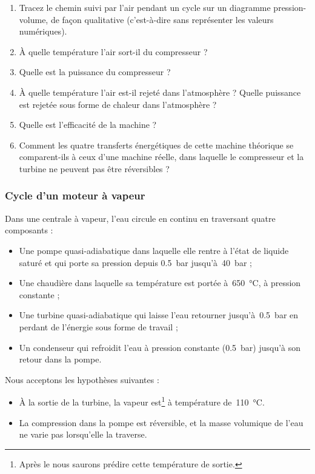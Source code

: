 	\begin{enumerate}
		\item Tracez le chemin suivi par l’air pendant un cycle sur un diagramme pression-volume, de façon qualitative (c’est-à-dire sans représenter les valeurs numériques).
		\item À quelle température l’air sort-il du compresseur ?
		\item Quelle est la puissance du compresseur ?
		\item À quelle température l’air est-il rejeté dans l’atmosphère ? Quelle puissance est rejetée sous forme de chaleur dans l’atmosphère ?
		\item Quelle est l’efficacité de la machine ?
		\item Comment les quatre transferts énergétiques de cette machine théorique se comparent-ils à ceux d’une machine réelle, dans laquelle le compresseur et la turbine ne peuvent pas être réversibles ?
	\end{enumerate}


\subsubsection{Cycle d’un moteur à vapeur}
\label{exo_centrale_vapeur_cycle}

	Dans une centrale à vapeur, l’eau circule en continu en traversant quatre composants :
	
	\begin{itemize}
		\item Une pompe quasi-adiabatique dans laquelle elle rentre à l’état de liquide saturé et qui porte sa pression depuis \SI{0,5}{\bar} jusqu’à~\SI{40}{\bar} ;
		\item Une chaudière dans laquelle sa température est portée à~\SI{650}{\degreeCelsius}, à pression constante ;
		\item Une turbine quasi-adiabatique qui laisse l’eau retourner jusqu’à~\SI{0,5}{\bar} en perdant de l’énergie sous forme de travail ;
		\item Un condenseur qui refroidit l’eau à pression constante (\SI{0,5}{\bar}) jusqu’à son retour dans la pompe.
	\end{itemize}
	
	Nous acceptons les hypothèses suivantes :
		\begin{itemize}
			\item À la sortie de la turbine, la vapeur est\footnote{Après le \courshuit nous saurons prédire cette température de sortie.} à température de~\SI{110}{\degreeCelsius}.
			\item La compression dans la pompe est réversible, et la masse volumique de l’eau ne varie pas lorsqu’elle la traverse.
		\end{itemize}
	
